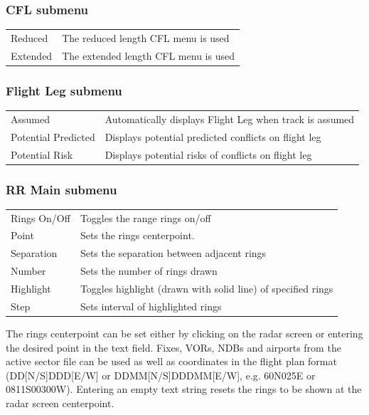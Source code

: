 \documentclass[a4paper,oneside,11pt]{memoir}
\begin{document}
\subsubsection{CFL submenu}\label{menu:cflsm}

\begin{longtable}{p{5cm} p{7.5cm}}
  Reduced   & The reduced length CFL menu is used   \\
  Extended  & The extended length CFL menu is used  \\
\end{longtable}

\subsubsection{Flight Leg submenu}\label{menu:flsm}

\begin{longtable}{p{5cm} p{7.5cm}}
  Assumed             & Automatically displays Flight Leg when track is assumed   \\
  Potential Predicted & Displays potential predicted conflicts on flight leg  \\
  Potential Risk      & Displays potential risks of conflicts on flight leg  \\
\end{longtable}

\subsubsection{RR Main submenu}
\label{menu:rr}

\begin{longtable}{p{5cm} p{7.5cm}}
  Rings On/Off      & Toggles the range rings on/off                                 \\
  Point             & Sets the rings centerpoint.                                 \\
  Separation        & Sets the separation between adjacent rings                  \\
  Number            & Sets the number of rings drawn                              \\
  Highlight         & Toggles highlight (drawn with solid line) of specified rings   \\
  Step              & Sets interval of highlighted rings                          \\
\end{longtable}

The rings centerpoint can be set either by clicking on the radar screen or entering the desired point in the text field. Fixes, VORs, NDBs and airports from the active sector file can be used as well as coordinates in the flight plan format (DD[N/S]DDD[E/W] or DDMM[N/S]DDDMM[E/W], e.g. 60N025E or 0811S00300W). Entering an empty text string resets the rings to be shown at the radar screen centerpoint.
\end{document}
